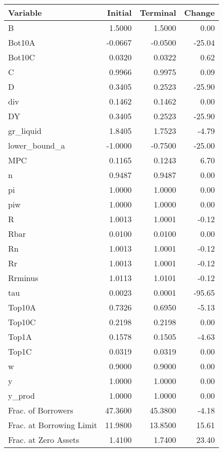 \begin{table}
\centering
\label{tab:stst}
\begin{tabular}{lrrr}
\toprule
                Variable &  Initial &  Terminal &  Change \\
\midrule
                       B &   1.5000 &    1.5000 &    0.00 \\
                  Bot10A &  -0.0667 &   -0.0500 &  -25.04 \\
                  Bot10C &   0.0320 &    0.0322 &    0.62 \\
                       C &   0.9966 &    0.9975 &    0.09 \\
                       D &   0.3405 &    0.2523 &  -25.90 \\
                     div &   0.1462 &    0.1462 &    0.00 \\
                      DY &   0.3405 &    0.2523 &  -25.90 \\
               gr\_liquid &   1.8405 &    1.7523 &   -4.79 \\
           lower\_bound\_a &  -1.0000 &   -0.7500 &  -25.00 \\
                     MPC &   0.1165 &    0.1243 &    6.70 \\
                       n &   0.9487 &    0.9487 &    0.00 \\
                      pi &   1.0000 &    1.0000 &    0.00 \\
                     piw &   1.0000 &    1.0000 &    0.00 \\
                       R &   1.0013 &    1.0001 &   -0.12 \\
                    Rbar &   0.0100 &    0.0100 &    0.00 \\
                      Rn &   1.0013 &    1.0001 &   -0.12 \\
                      Rr &   1.0013 &    1.0001 &   -0.12 \\
                 Rrminus &   1.0113 &    1.0101 &   -0.12 \\
                     tau &   0.0023 &    0.0001 &  -95.65 \\
                  Top10A &   0.7326 &    0.6950 &   -5.13 \\
                  Top10C &   0.2198 &    0.2198 &    0.00 \\
                   Top1A &   0.1578 &    0.1505 &   -4.63 \\
                   Top1C &   0.0319 &    0.0319 &    0.00 \\
                       w &   0.9000 &    0.9000 &    0.00 \\
                       y &   1.0000 &    1.0000 &    0.00 \\
                  y\_prod &   1.0000 &    1.0000 &    0.00 \\
      Frac. of Borrowers &  47.3600 &   45.3800 &   -4.18 \\
Frac. at Borrowing Limit &  11.9800 &   13.8500 &   15.61 \\
    Frac. at Zero Assets &   1.4100 &    1.7400 &   23.40 \\
\bottomrule
\end{tabular}
\end{table}

